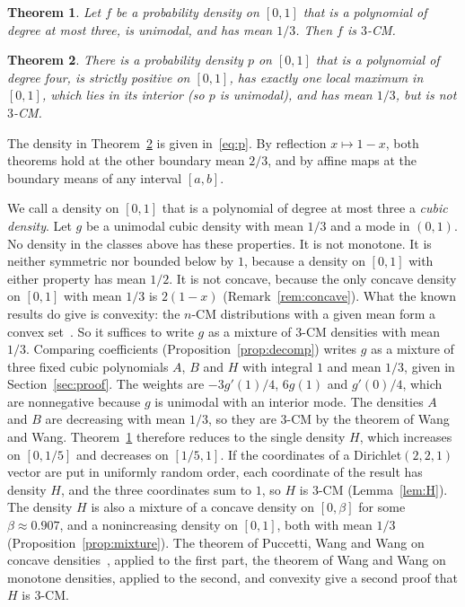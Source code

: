 \documentclass[11pt]{amsart}
\newtheorem{theorem}{Theorem}[section]
\theoremstyle{remark}
\numberwithin{equation}{section}
\begin{document}
\begin{theorem}\label{thm:main}
Let $f$ be a probability density on $[0,1]$ that is a polynomial of degree
at most three, is unimodal, and has mean $1/3$. Then $f$ is $3$-CM.
\end{theorem}

\begin{theorem}\label{thm:sharp}
There is a probability density $p$ on $[0,1]$ that is a polynomial of degree
four, is strictly positive on $[0,1]$, has exactly one local maximum in
$[0,1]$, which lies in its interior (so $p$ is unimodal), and has mean
$1/3$, but is not $3$-CM.
\end{theorem}

The density in Theorem~\ref{thm:sharp} is given in~\eqref{eq:p}. By
reflection $x\mapsto1-x$, both theorems hold at the other boundary mean
$2/3$, and by affine maps at the boundary means of any interval $[a,b]$.

We call a density on $[0,1]$ that is a polynomial of degree at most three a
\emph{cubic density}. Let $g$ be a unimodal cubic density with mean $1/3$
and a mode in $(0,1)$. No density in the classes above has these
properties. It is not monotone. It is neither symmetric nor bounded below
by $1$, because a density on $[0,1]$ with either property has mean $1/2$.
It is not concave, because the only concave density on $[0,1]$ with mean
$1/3$ is $2(1-x)$ (Remark~\ref{rem:concave}). What the known results do
give is convexity: the $n$-CM distributions with a given mean form a
convex set~\cite[Proposition~2.1(3)]{WW11}. So it suffices to write $g$ as
a mixture of $3$-CM densities with mean $1/3$. Comparing coefficients
(Proposition~\ref{prop:decomp}) writes $g$ as a mixture of three fixed
cubic polynomials $A$, $B$ and $H$ with integral $1$ and mean $1/3$, given
in Section~\ref{sec:proof}. The weights are $-3g'(1)/4$, $6g(1)$ and
$g'(0)/4$, which are nonnegative because $g$ is unimodal with an interior
mode. The densities $A$ and $B$ are decreasing with mean $1/3$, so they are
$3$-CM by the theorem of Wang and Wang. Theorem~\ref{thm:main} therefore
reduces to the single density $H$, which increases on $[0,1/5]$ and
decreases on $[1/5,1]$. If the coordinates of a Dirichlet$(2,2,1)$ vector
are put in uniformly random order, each coordinate of the result has
density $H$, and the three coordinates sum to $1$, so $H$ is $3$-CM
(Lemma~\ref{lem:H}). The density $H$ is also a mixture of a concave
density on $[0,\beta]$ for some $\beta\approx0.907$, and a nonincreasing density
on $[0,1]$, both with mean $1/3$ (Proposition~\ref{prop:mixture}). The
theorem of Puccetti, Wang and Wang on concave
densities~\cite[Theorem~4.2]{PWW12}, applied to the first part, the
theorem of Wang and Wang on monotone densities, applied to the second, and
convexity give a second proof that $H$ is $3$-CM.
\end{document}
